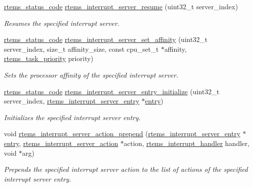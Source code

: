 \begin{DoxyCompactItemize}
\mbox{\hyperlink{group__ClassicStatus_ga545d41846817eaba6143d52ee4d9e9fe}{rtems\+\_\+status\+\_\+code}} \mbox{\hyperlink{group__rtems__interrupt__extension_ga69c0c38dd1999db80b4104a327caba46}{rtems\+\_\+interrupt\+\_\+server\+\_\+resume}} (uint32\+\_\+t server\+\_\+index)
\begin{DoxyCompactList}\small\item\em Resumes the specified interrupt server. \end{DoxyCompactList}\item 
\mbox{\hyperlink{group__ClassicStatus_ga545d41846817eaba6143d52ee4d9e9fe}{rtems\+\_\+status\+\_\+code}} \mbox{\hyperlink{group__rtems__interrupt__extension_ga759f271ddd8a58e83b79058702634c57}{rtems\+\_\+interrupt\+\_\+server\+\_\+set\+\_\+affinity}} (uint32\+\_\+t server\+\_\+index, size\+\_\+t affinity\+\_\+size, const cpu\+\_\+set\+\_\+t $\ast$affinity, \mbox{\hyperlink{group__ClassicTasks_gaa80a0c0938307d1e99d0eb5fee765b47}{rtems\+\_\+task\+\_\+priority}} priority)
\begin{DoxyCompactList}\small\item\em Sets the processor affinity of the specified interrupt server. \end{DoxyCompactList}\item 
\mbox{\hyperlink{group__ClassicStatus_ga545d41846817eaba6143d52ee4d9e9fe}{rtems\+\_\+status\+\_\+code}} \mbox{\hyperlink{group__rtems__interrupt__extension_ga86ea2e100b06ad64fa320381bb34d2d1}{rtems\+\_\+interrupt\+\_\+server\+\_\+entry\+\_\+initialize}} (uint32\+\_\+t server\+\_\+index, \mbox{\hyperlink{structrtems__interrupt__server__entry}{rtems\+\_\+interrupt\+\_\+server\+\_\+entry}} $\ast$\mbox{\hyperlink{structentry}{entry}})
\begin{DoxyCompactList}\small\item\em Initializes the specified interrupt server entry. \end{DoxyCompactList}\item 
void \mbox{\hyperlink{group__rtems__interrupt__extension_ga734c36a08deae3d40775f46e526526be}{rtems\+\_\+interrupt\+\_\+server\+\_\+action\+\_\+prepend}} (\mbox{\hyperlink{structrtems__interrupt__server__entry}{rtems\+\_\+interrupt\+\_\+server\+\_\+entry}} $\ast$\mbox{\hyperlink{structentry}{entry}}, \mbox{\hyperlink{structrtems__interrupt__server__action}{rtems\+\_\+interrupt\+\_\+server\+\_\+action}} $\ast$action, \mbox{\hyperlink{group__rtems__interrupt__extension_gab39bd096ab2c3b41d03dace0e9777b08}{rtems\+\_\+interrupt\+\_\+handler}} handler, void $\ast$arg)
\begin{DoxyCompactList}\small\item\em Prepends the specified interrupt server action to the list of actions of the specified interrupt server entry. \end{DoxyCompactList}\item 

\end{DoxyCompactItemize}
